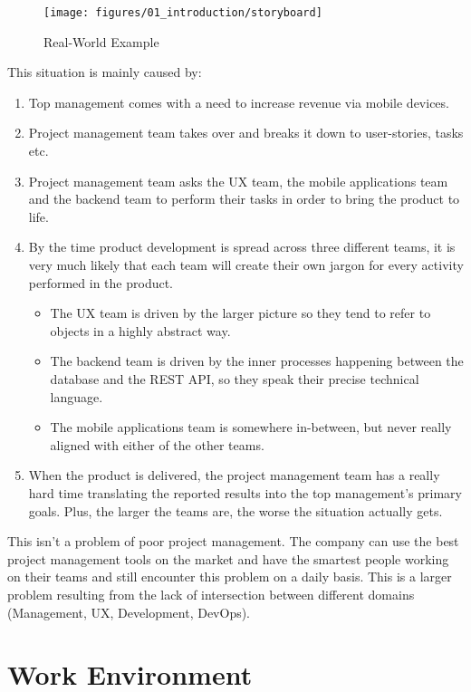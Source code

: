 \begin{figure}[!ht]
	\centering
	\texttt{[image: figures/01\_introduction/storyboard]}
    \caption{Real-World Example}
\end{figure}

This situation is mainly caused by:

\begin{enumerate}
	\item Top management comes with a need to increase revenue via mobile devices.
	\item Project management team takes over and breaks it down to user-stories, tasks etc.
	\item Project management team asks the UX team, the mobile applications team and the backend team to perform their tasks in order to bring the product to life.
	\item By the time product development is spread across three different teams, it is very much likely that each team will create their own jargon for every activity performed in the product.
		\begin{itemize}
			\item The UX team is driven by the larger picture so they tend to refer to objects in a highly abstract way.
			\item The backend team is driven by the inner processes happening between the database and the REST API, so they speak their precise technical language.
			\item The mobile applications team is somewhere in-between, but never really aligned with either of the other teams.
		\end{itemize}
	\item When the product is delivered, the project management team has a really hard time translating the reported results into the top management's primary goals. Plus, the larger the teams are, the worse the situation actually gets.
\end{enumerate}

This isn't a problem of poor project management. The company can use the best project management tools on the market and have the smartest people working on their teams and still encounter this problem on a daily basis. This is a larger problem resulting from the lack of intersection between different domains (Management, UX, Development, DevOps).

\newpage

\section{Work Environment}

